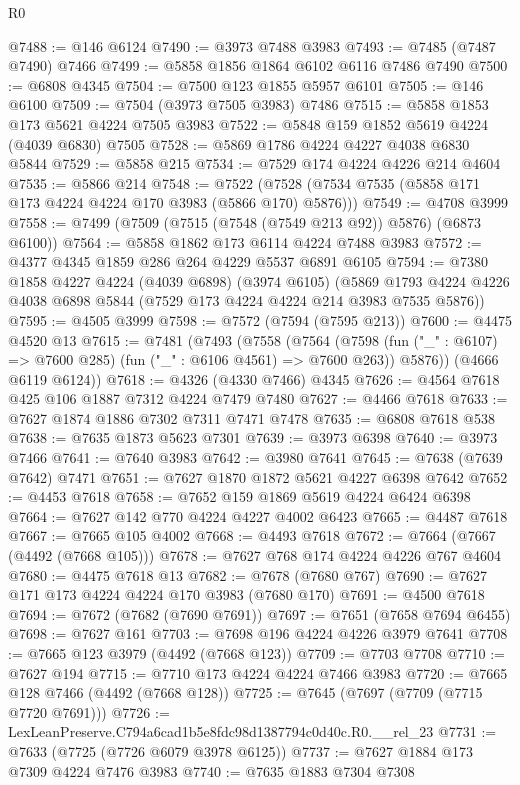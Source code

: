 \begin{lexlean}{R0}
\begin{coremodule}
@7488 := @146 @6124
@7490 := @3973 @7488 @3983
@7493 := @7485 (@7487 @7490) @7466
@7499 := @5858 @1856 @1864 @6102 @6116 @7486 @7490
@7500 := @6808 @4345
@7504 := @7500 @123 @1855 @5957 @6101
@7505 := @146 @6100
@7509 := @7504 (@3973 @7505 @3983) @7486
@7515 := @5858 @1853 @173 @5621 @4224 @7505 @3983
@7522 := @5848 @159 @1852 @5619 @4224 (@4039 @6830) @7505
@7528 := @5869 @1786 @4224 @4227 @4038 @6830 @5844
@7529 := @5858 @215
@7534 := @7529 @174 @4224 @4226 @214 @4604
@7535 := @5866 @214
@7548 := @7522 (@7528 (@7534 @7535 (@5858 @171 @173 @4224 @4224 @170 @3983 (@5866 @170) @5876)))
@7549 := @4708 @3999
@7558 := @7499 (@7509 (@7515 (@7548 (@7549 @213 @92)) @5876) (@6873 @6100))
@7564 := @5858 @1862 @173 @6114 @4224 @7488 @3983
@7572 := @4377 @4345 @1859 @286 @264 @4229 @5537 @6891 @6105
@7594 := @7380
    @1858
    @4227
    @4224
    (@4039 @6898)
    (@3974 @6105)
    (@5869 @1793 @4224 @4226 @4038 @6898 @5844 (@7529 @173 @4224 @4224 @214 @3983 @7535 @5876))
@7595 := @4505 @3999
@7598 := @7572 (@7594 (@7595 @213))
@7600 := @4475 @4520 @13
@7615 := @7481
    (@7493
      (@7558
        (@7564
          (@7598 (fun ("_" : @6107) => @7600 @285) (fun ("_" : @6106 @4561) => @7600 @263))
          @5876))
      (@4666 @6119 @6124))
@7618 := @4326 (@4330 @7466) @4345
@7626 := @4564 @7618 @425 @106 @1887 @7312 @4224 @7479 @7480
@7627 := @4466 @7618
@7633 := @7627 @1874 @1886 @7302 @7311 @7471 @7478
@7635 := @6808 @7618 @538
@7638 := @7635 @1873 @5623 @7301
@7639 := @3973 @6398
@7640 := @3973 @7466
@7641 := @7640 @3983
@7642 := @3980 @7641
@7645 := @7638 (@7639 @7642) @7471
@7651 := @7627 @1870 @1872 @5621 @4227 @6398 @7642
@7652 := @4453 @7618
@7658 := @7652 @159 @1869 @5619 @4224 @6424 @6398
@7664 := @7627 @142 @770 @4224 @4227 @4002 @6423
@7665 := @4487 @7618
@7667 := @7665 @105 @4002
@7668 := @4493 @7618
@7672 := @7664 (@7667 (@4492 (@7668 @105)))
@7678 := @7627 @768 @174 @4224 @4226 @767 @4604
@7680 := @4475 @7618 @13
@7682 := @7678 (@7680 @767)
@7690 := @7627 @171 @173 @4224 @4224 @170 @3983 (@7680 @170)
@7691 := @4500 @7618
@7694 := @7672 (@7682 (@7690 @7691))
@7697 := @7651 (@7658 @7694 @6455)
@7698 := @7627 @161
@7703 := @7698 @196 @4224 @4226 @3979 @7641
@7708 := @7665 @123 @3979 (@4492 (@7668 @123))
@7709 := @7703 @7708
@7710 := @7627 @194
@7715 := @7710 @173 @4224 @4224 @7466 @3983
@7720 := @7665 @128 @7466 (@4492 (@7668 @128))
@7725 := @7645 (@7697 (@7709 (@7715 @7720 @7691)))
@7726 := LexLeanPreserve.C794a6cad1b5e8fdc98d1387794c0d40c.R0.__rel_23
@7731 := @7633 (@7725 (@7726 @6079 @3978 @6125))
@7737 := @7627 @1884 @173 @7309 @4224 @7476 @3983
@7740 := @7635 @1883 @7304 @7308

\end{coremodule}
\end{lexlean}

